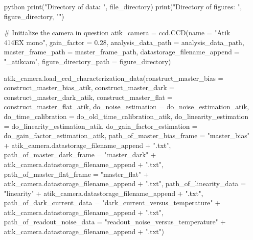 \documentclass[../main.tex]{subfiles}
\begin{document}
\begin{mintedbox}{python}
print("Directory of data:    ", file_directory)
print("Directory of figures: ", figure_directory, "\n")

# Initialize the camera in question
atik_camera  =  ccd.CCD(name  =  "Atik 414EX mono",
gain_factor  =  0.28,
analysis_data_path  =  analysis_data_path,
master_frame_path  =  master_frame_path,
datastorage_filename_append  =  "_atikcam",
figure_directory_path  =  figure_directory)

atik_camera.load_ccd_characterization_data(construct_master_bias  =  construct_master_bias_atik,
construct_master_dark  =  construct_master_dark_atik,
construct_master_flat  =  construct_master_flat_atik,
do_noise_estimation  =  do_noise_estimation_atik,
do_time_calibration  =  do_old_time_calibration_atik,
do_linearity_estimation  =  do_linearity_estimation_atik,
do_gain_factor_estimation  =  do_gain_factor_estimation_atik,
path_of_master_bias_frame  =  "master_bias" + atik_camera.datastorage_filename_append + ".txt",
path_of_master_dark_frame  =  "master_dark" + atik_camera.datastorage_filename_append + ".txt",
path_of_master_flat_frame  =  "master_flat" + atik_camera.datastorage_filename_append + ".txt",
path_of_linearity_data  =  "linearity" + atik_camera.datastorage_filename_append + ".txt",
path_of_dark_current_data  =  "dark_current_versus_temperature" + atik_camera.datastorage_filename_append + ".txt",
path_of_readout_noise_data  =  "readout_noise_versus_temperature" + atik_camera.datastorage_filename_append + ".txt")


\end{mintedbox}
\end{document}
